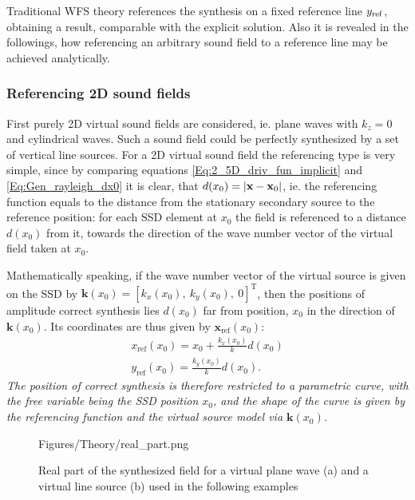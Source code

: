 Traditional WFS theory references the synthesis on a fixed reference line $y_{\mathrm{ref}}$, obtaining a result, comparable with the explicit solution. Also it is revealed in the followings, how referencing an arbitrary sound field to a reference line may be achieved analytically.

\subsubsection{Referencing 2D sound fields}

First purely 2D virtual sound fields are considered, ie. plane waves with $k_z=0$ and cylindrical waves. Such a sound field could be perfectly synthesized by a set of vertical line sources.
For a 2D virtual sound field the referencing type is very simple, since by comparing equations \eqref{Eq:2_5D_driv_fun_implicit} and \eqref{Eq:Gen_rayleigh_dx0} it is clear, that $d(x_0) = |\mathbf{x}-\mathbf{x}_0|$, ie. the referencing function equals to the distance from the stationary secondary source to the reference position: for each SSD element at $x_0$ the field is referenced to a distance $d(x_0)$ from it, towards the direction of the wave number vector of the virtual field taken at $x_0$.

Mathematically speaking, if the wave number vector of the virtual source is given on the SSD by $\mathbf{k}(x_0) = [k_x(x_0),\ k_y(x_0),\ 0]^{\mathrm{T}}$, then the positions of amplitude correct synthesis lies $d(x_0)$ far from position, $x_0$ in the direction of $\mathbf{k}(x_0)$. Its coordinates are thus given by $\mathbf{x}_{\mathrm{ref}}(x_0)$:
\begin{eqnarray}
x_{\mathrm{ref}}(x_0) = x_0 + \frac{k_x(x_0)}{k} d(x_0) \\
y_{\mathrm{ref}}(x_0) = \frac{k_y(x_0)}{k} d(x_0).
\end{eqnarray}
\emph{The position of correct synthesis is therefore restricted to a parametric curve, with the free variable being the SSD position $x_0$, and the shape of the curve is given by the referencing function and the virtual source model via $\mathbf{k}(x_0)$.}

\begin{figure}
	\centering
	\begin{overpic}[width = 1\columnwidth ]{Figures/Theory/real_part.png}
	\scriptsize
	\end{overpic}
\caption{Real part of the synthesized field for a virtual plane wave (a) and a virtual line source (b) used in the following examples}
	\label{Fig:Theory:Real_part}
\end{figure}

